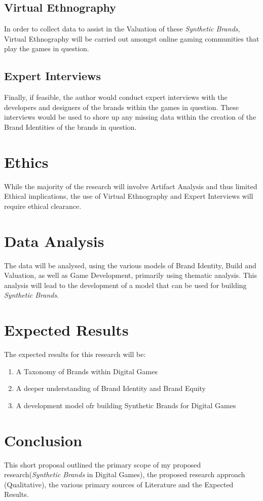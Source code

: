 \documentclass[10pt,twoside]{article}
\begin{document}
\subsection{Virtual Ethnography}

In order to collect data to assist in the Valuation of these \emph{Synthetic Brands}, Virtual Ethnography will be carried out amongst online gaming communities that play the games in question.

\subsection{Expert Interviews}

Finally, if feasible, the author would conduct expert interviews with the developers and designers of the brands within the games in question. These interviews would be used to shore up any missing data within the creation of the Brand Identities of the brands in question.

\section{Ethics}

While the majority of the research will involve Artifact Analysis and thus limited Ethical implications, the use of Virtual Ethnography and Expert Interviews will require ethical clearance.

\section{Data Analysis}

The data will be analysed, using the various models of Brand Identity, Build and Valuation, as well as Game Development, primarily using thematic analysis. This analysis will lead to the development of a model that can be used for building \emph{Synthetic Brands}.

\section{Expected Results}

 The expected results for this research will be:
\begin{enumerate}
	\item A Taxonomy of Brands within Digital Games
	\item A deeper understanding of Brand Identity and Brand Equity
	\item A development model ofr building Synthetic Brands for Digital Games
\end{enumerate}

\section{Conclusion}

This short proposal outlined the primary scope of my proposed research(\emph{Synthetic Brands} in Digital Games), the proposed research approach (Qualitative), the various primary sources of Literature and the Expected Results.



\end{document}
